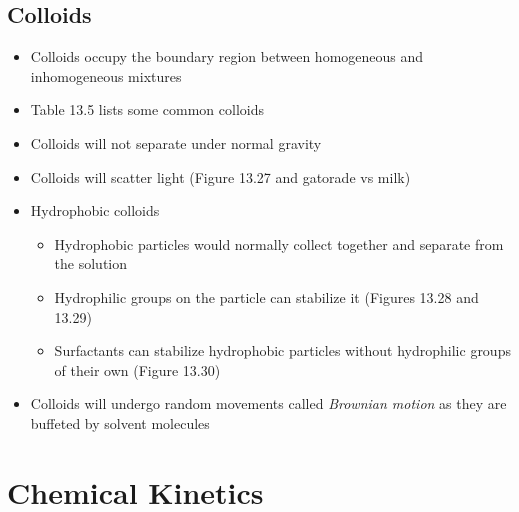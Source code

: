 \documentclass[12pt, openany, letterpaper]{memoir}
\begin{document}
\section{Colloids}
\begin{itemize}
  \item Colloids occupy the boundary region between homogeneous and inhomogeneous mixtures
  \item Table 13.5 lists some common colloids
  \item Colloids will not separate under normal gravity
  \item Colloids will scatter light (Figure 13.27 and gatorade vs milk)
  \item Hydrophobic colloids
  \begin{itemize}
    \item Hydrophobic particles would normally collect together and separate from the solution
    \item Hydrophilic groups on the particle can stabilize it (Figures 13.28 and 13.29)
    \item Surfactants can stabilize hydrophobic particles without hydrophilic groups of their own (Figure 13.30)
  \end{itemize}
  \item Colloids will undergo random movements called \emph{Brownian motion} as they are buffeted by solvent molecules
\end{itemize}

\chapter{Chemical Kinetics}
\end{document}
